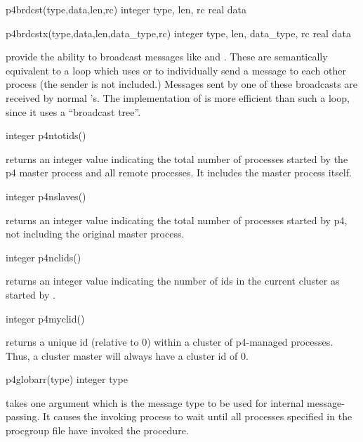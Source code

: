 \begin{example}
p4brdcst(type,data,len,rc)
integer type, len, rc
real data
\end{example}

\begin{example}
p4brdcstx(type,data,len,data_type,rc)
integer type, len, data_type, rc
real data
\end{example}
\noindent
provide the ability to broadcast messages like  and
.  These are semantically equivalent to a loop which uses
 or  to individually send a message to each
other process (the sender is not included.)  Messages sent by one of these
broadcasts are received by normal 's.  The implementation of 
 is more efficient than such a loop, since it uses a
``broadcast tree''.

\begin{example}
integer p4ntotids()
\end{example}
\noindent
returns an integer value indicating the total number of processes started
by the p4 master process and all remote processes.  It includes the master
process itself.

\begin{example}
integer p4nslaves()
\end{example}
\noindent
returns an integer value indicating the total number of processes started
by p4, not including the original master process.

\begin{example}
integer p4nclids()
\end{example}
\noindent
returns an integer value indicating the number of ids in the current
cluster as started by .  

\begin{example}
integer p4myclid()
\end{example}
\noindent
returns a unique id (relative to 0) within a cluster of p4-managed
processes.  Thus, a cluster master will always have a cluster id of 0.

\begin{example}
p4globarr(type)
integer type
\end{example}
\noindent
takes one argument which is the message type to be used for internal
message-passing.  It causes the invoking process to wait until all processes
specified in the procgroup file have invoked the procedure.

